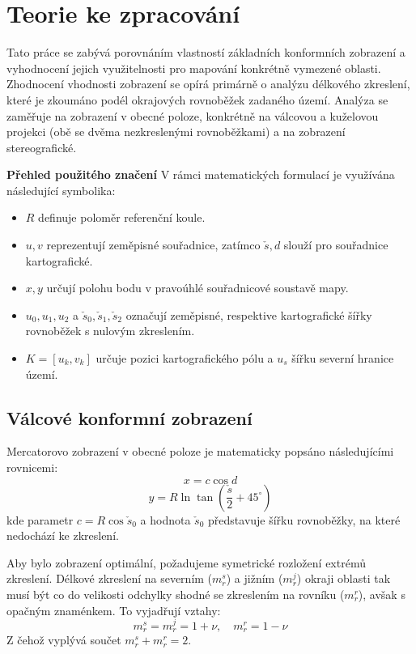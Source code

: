 \section{Teorie ke zpracování}

Tato práce se zabývá porovnáním vlastností základních konformních zobrazení a vyhodnocení jejich využitelnosti pro mapování konkrétně vymezené oblasti. Zhodnocení vhodnosti zobrazení se opírá primárně o analýzu délkového zkreslení, které je zkoumáno podél okrajových rovnoběžek zadaného území. Analýza se zaměřuje na zobrazení v obecné poloze, konkrétně na válcovou a kuželovou projekci (obě se dvěma nezkreslenými rovnoběžkami) a na zobrazení stereografické.

\textbf{Přehled použitého značení}
V rámci matematických formulací je využívána následující symbolika:
\begin{itemize}
    \item $R$ definuje poloměr referenční koule.
    \item $u, v$ reprezentují zeměpisné souřadnice, zatímco $\check{s}, d$ slouží pro souřadnice kartografické.
    \item $x, y$ určují polohu bodu v pravoúhlé souřadnicové soustavě mapy.
    \item $u_0, u_1, u_2$ a $\check{s}_0, \check{s}_1, \check{s}_2$ označují zeměpisné, respektive kartografické šířky rovnoběžek s nulovým zkreslením.
    \item $K = [u_k, v_k]$ určuje pozici kartografického pólu a $u_s$ šířku severní hranice území.
\end{itemize}

\subsection{Válcové konformní zobrazení}
Mercatorovo zobrazení v obecné poloze je matematicky popsáno následujícími rovnicemi:
$$x = c \cos d$$ 
$$y = R \ln \tan\left(\frac{\check{s}}{2} + 45^\circ\right)$$ 
kde parametr $c = R \cos \check{s}_0$ a hodnota $\check{s}_0$ představuje šířku rovnoběžky, na které nedochází ke zkreslení. 

Aby bylo zobrazení optimální, požadujeme symetrické rozložení extrémů zkreslení. Délkové zkreslení na severním ($m_r^s$) a jižním ($m_r^j$) okraji oblasti tak musí být co do velikosti odchylky shodné se zkreslením na rovníku ($m_r^r$), avšak s opačným znaménkem. To vyjadřují vztahy:
$$m_r^s = m_r^j = 1 + \nu, \quad m_r^r = 1 - \nu$$ 
Z čehož vyplývá součet $m_r^s + m_r^r = 2$.

